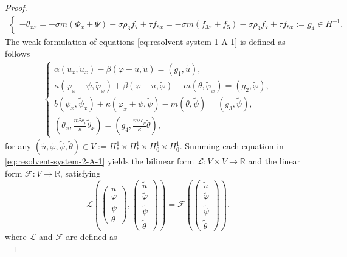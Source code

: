 \documentclass[11pt,reqno]{article}
\newcommand{\dt}{\tilde}
\begin{document}
\begin{proof}
\begin{align}
\begin{cases}
			- \theta_{xx} = - \sigma m(\Phi_x + \Psi) - \sigma \rho_3 f_7 + \tau f_{8x}=- \sigma m(f_{3x} + f_5) - \sigma \rho_3 f_7 + \tau f_{8x}:=g_4 \in H^{-1}.
		\end{cases}
	\end{align}
	The weak formulation of equations \eqref{eq:resolvent-system-1-A-1} is defined as follows
	\begin{align}\label{eq:resolvent-system-2-A-1}
		\begin{cases}
			\alpha(u_x, \tilde{u}_x) - \beta(\varphi - u, \tilde{u}) = (g_1, \tilde{u}), \\
			\kappa(\varphi_x + \psi, \dt \varphi_x) + \beta(\varphi - u, \dt \varphi) - m(\theta, \dt \varphi_x) = (g_2, \dt \varphi), \\
			b(\psi_x, \dt \psi_x) + \kappa(\varphi_x + \psi, \dt \psi) - m(\theta, \dt \psi) = (g_3, \dt \psi), \\
			\left(\theta_x, \frac{m^2 c_p}{\kappa } \dt \theta_x\right) = \left(g_4, \frac{m^2 c_p}{\kappa } \dt \theta\right),
		\end{cases}
	\end{align}
	for any $(\tilde{u}, \tilde{\varphi}, \tilde{\psi}, \tilde{\theta}) \in V := H_*^1 \times H_*^1 \times H_0^1 \times H_0^1$. Summing each equation in \eqref{eq:resolvent-system-2-A-1} yields the bilinear form $\mathcal{L}: V \times V \to \mathbb{R}$ and the linear form $\mathcal{F}:V \to \mathbb{R}$, satisfying
	\begin{equation}\label{LF}
		\mathcal{L}\left(
		\begin{pmatrix}u\\ \varphi \\ \psi \\ \theta\end{pmatrix},
		\begin{pmatrix}\tilde{u}\\ \tilde{\varphi} \\ \tilde{\psi} \\ \tilde{\theta}\end{pmatrix}
		\right) = \mathcal{F}\left(
		\begin{pmatrix}\tilde{u}\\ \tilde{\varphi} \\ \tilde{\psi} \\ \tilde{\theta}\end{pmatrix}
		\right).
	\end{equation}
	where $\mathcal{L}$ and $\mathcal{F}$ are defined as
	\begin{equation}\label{L}

\end{equation}
\end{proof}
\end{document}

